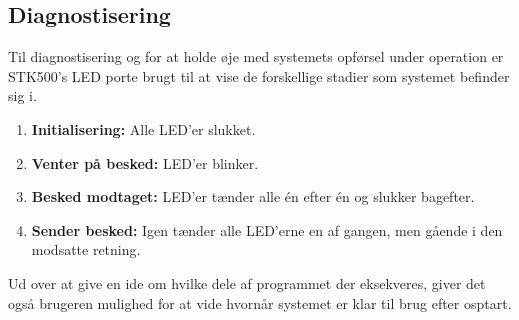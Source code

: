 \subsection{Diagnostisering}
Til diagnostisering og for at holde øje med systemets opførsel under operation er STK500's LED porte brugt til at vise de forskellige stadier som systemet befinder sig i.

\begin{enumerate}
	\item \textbf{Initialisering:} Alle LED'er slukket.
	\item \textbf{Venter på besked:} LED'er blinker.
	\item \textbf{Besked modtaget:} LED'er tænder alle én efter én og slukker bagefter.
	\item \textbf{Sender besked:} Igen tænder alle LED'erne en af gangen, men gående i den modsatte retning.
\end{enumerate}

Ud over at give en ide om hvilke dele af programmet der eksekveres, giver det også brugeren mulighed for at vide hvornår systemet er klar til brug efter osptart.